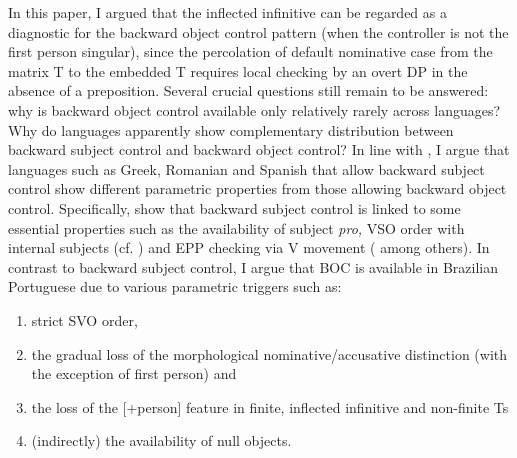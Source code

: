\documentclass[output=paper]{langsci/langscibook}
\begin{document}
In this paper, I argued that the inflected infinitive can be regarded as a diagnostic for the backward object control pattern (when the controller is not the first person singular), since the percolation of default nominative case from the matrix T to the embedded T requires local checking by an overt DP in the absence of a preposition. Several crucial questions still remain to be answered: why is backward object control available only relatively rarely across languages? Why do languages apparently show complementary distribution between backward subject control and backward object control? In line with \citet{Alexiadou2010}, I argue that languages such as Greek, Romanian and Spanish that allow backward subject control show different parametric properties from those allowing backward object control. Specifically, \citet{Alexiadou2010} show that backward subject control is linked to some essential properties such as the availability of subject \textit{pro,} VSO order with internal subjects (cf. \citealt{Alexiadou2001}) and EPP checking via V movement (\citealt{Alexiadou1998} among others). In contrast to backward subject control, I argue that BOC is available in Brazilian Portuguese due to various parametric triggers such as:
\begin{enumerate}
\item strict SVO order, 
\item the gradual loss of the morphological nominative\slash accusative distinction (with the exception of first person) and 
\item the loss of the [+person] feature in finite, inflected infinitive and non-finite Ts
\item (indirectly) the availability of null objects. 
\end{enumerate}
\end{document}
